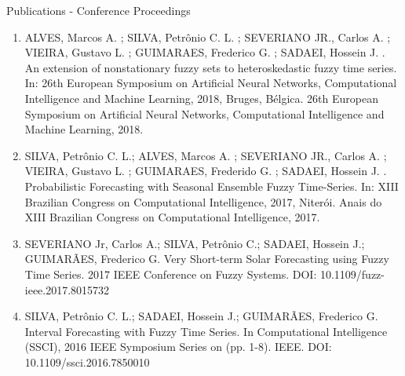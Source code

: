 \documentclass{beamer}
\begin{document}
\begin{frame}{Publications - Conference Proceedings}
\scriptsize
\begin{enumerate}
\item ALVES, Marcos A. ; SILVA, Petrônio C. L. ; SEVERIANO JR., Carlos A. ; VIEIRA, Gustavo L. ; GUIMARAES, Frederico G. ; SADAEI, Hossein J. . An extension of nonstationary fuzzy sets to heteroskedastic fuzzy time series. In: 26th European Symposium on Artificial Neural Networks, Computational Intelligence and Machine Learning, 2018, Bruges, Bélgica. 26th European Symposium on Artificial Neural Networks, Computational Intelligence and Machine Learning, 2018.
\item SILVA, Petrônio C. L.; ALVES, Marcos A. ; SEVERIANO JR., Carlos A. ; VIEIRA, Gustavo L. ; GUIMARAES, Frederido G. ; SADAEI, Hossein J. . Probabilistic Forecasting with Seasonal Ensemble Fuzzy Time-Series. In: XIII Brazilian Congress on Computational Intelligence, 2017, Niterói. Anais do XIII Brazilian Congress on Computational Intelligence, 2017.
\item SEVERIANO Jr, Carlos A.; SILVA, Petrônio C.; SADAEI, Hossein J.; GUIMARÃES, Frederico G. Very Short-term Solar Forecasting using Fuzzy Time Series. 2017 IEEE Conference on Fuzzy Systems. DOI: 10.1109/fuzz-ieee.2017.8015732
\item SILVA, Petrônio C. L.; SADAEI, Hossein J.; GUIMARÃES, Frederico G. Interval Forecasting with Fuzzy Time Series. In Computational Intelligence (SSCI), 2016 IEEE Symposium Series on (pp. 1-8). IEEE. DOI: 10.1109/ssci.2016.7850010
\end{enumerate}
\end{frame}
\end{document}
